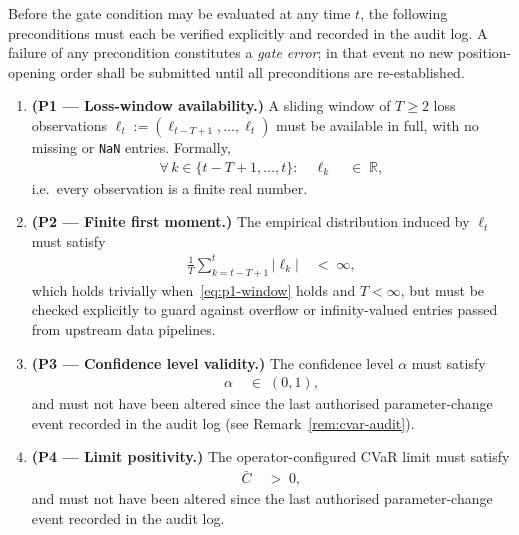 \documentclass[12pt,openany]{book}
\numberwithin{equation}{chapter}
\theoremstyle{plain}
\theoremstyle{definition}
\theoremstyle{remark}
\numberwithin{equation}{chapter}
\theoremstyle{plain}
\begin{document}
Before the gate condition may be evaluated at any time $t$, the
following preconditions must each be verified explicitly and
recorded in the audit log.  A failure of any precondition
constitutes a \emph{gate error}; in that event no new position-opening
order shall be submitted until all preconditions are re-established.

\begin{enumerate}
  \item \textbf{(P1 --- Loss-window availability.)}
        A sliding window of $T \geq 2$ loss observations
        $\boldsymbol{\ell}_t := (\ell_{t-T+1}, \ldots, \ell_t)$
        must be available in full, with no missing or \texttt{NaN}
        entries.  Formally,
        \begin{align}
          \forall\, k \in \{t-T+1,\ldots,t\}:
            \quad \ell_k \;&\in\; \mathbb{R},
            \label{eq:p1-window}
        \end{align}
        i.e.\ every observation is a finite real number.

  \item \textbf{(P2 --- Finite first moment.)}
        The empirical distribution induced by
        $\boldsymbol{\ell}_t$ must satisfy
        \begin{align}
          \frac{1}{T}\sum_{k=t-T+1}^{t} |\ell_k|
            \;&<\; \infty,
            \label{eq:p2-l1}
        \end{align}
        which holds trivially when~\eqref{eq:p1-window} holds and
        $T < \infty$, but must be checked explicitly to guard against
        overflow or infinity-valued entries passed from upstream data
        pipelines.

  \item \textbf{(P3 --- Confidence level validity.)}
        The confidence level $\alpha$ must satisfy
        \begin{align}
          \alpha \;&\in\; (0,1),
            \label{eq:p3-alpha}
        \end{align}
        and must not have been altered since the last authorised
        parameter-change event recorded in the audit log
        (see Remark~\ref{rem:cvar-audit}).

  \item \textbf{(P4 --- Limit positivity.)}
        The operator-configured CVaR limit must satisfy
        \begin{align}
          \bar{C} \;&>\; 0,
            \label{eq:p4-limit}
        \end{align}
        and must not have been altered since the last authorised
        parameter-change event recorded in the audit log.


\end{enumerate}
\end{document}
